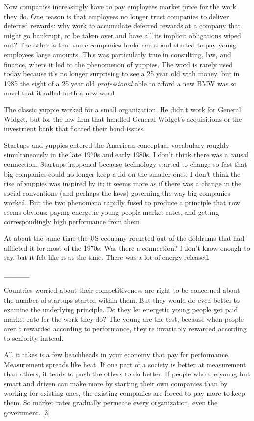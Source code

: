 Now companies increasingly have to pay employees market price for the
work they do. One reason is that employees no longer trust companies to
deliver \href{ladder.html}{deferred rewards}: why work to accumulate
deferred rewards at a company that might go bankrupt, or be taken over
and have all its implicit obligations wiped out? The other is that some
companies broke ranks and started to pay young employees large amounts.
This was particularly true in consulting, law, and finance, where it led
to the phenomenon of yuppies. The word is rarely used today because it's
no longer surprising to see a 25 year old with money, but in 1985 the
sight of a 25 year old \emph{professional} able to afford a new BMW was
so novel that it called forth a new word.

The classic yuppie worked for a small organization. He didn't work for
General Widget, but for the law firm that handled General Widget's
acquisitions or the investment bank that floated their bond issues.

Startups and yuppies entered the American conceptual vocabulary roughly
simultaneously in the late 1970s and early 1980s. I don't think there
was a causal connection. Startups happened because technology started to
change so fast that big companies could no longer keep a lid on the
smaller ones. I don't think the rise of yuppies was inspired by it; it
seems more as if there was a change in the social conventions (and
perhaps the laws) governing the way big companies worked. But the two
phenomena rapidly fused to produce a principle that now seems obvious:
paying energetic young people market rates, and getting correspondingly
high performance from them.

At about the same time the US economy rocketed out of the doldrums that
had afflicted it for most of the 1970s. Was there a connection? I don't
know enough to say, but it felt like it at the time. There was a lot of
energy released.

\_\_\_\_\_

Countries worried about their competitiveness are right to be concerned
about the number of startups started within them. But they would do even
better to examine the underlying principle. Do they let energetic young
people get paid market rate for the work they do? The young are the
test, because when people aren't rewarded according to performance,
they're invariably rewarded according to seniority instead.

All it takes is a few beachheads in your economy that pay for
performance. Measurement spreads like heat. If one part of a society is
better at measurement than others, it tends to push the others to do
better. If people who are young but smart and driven can make more by
starting their own companies than by working for existing ones, the
existing companies are forced to pay more to keep them. So market rates
gradually permeate every organization, even the government.
{[}\hyperref[f3n]{3}{]}

